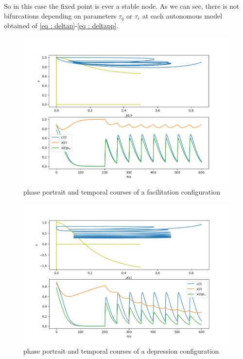 So in this case the fixed point is ever a stable node. As we can see, there is not bifurcations depending on parameters $\tau_q$ or $\tau_c$ at each autonomous model obtained of \eqref{eq : deltap}-\eqref{eq : deltapp}. 
\begin{figure}
\includegraphics[width=\textwidth]{facilitacion.png}
\caption{phase portrait and temporal courses of a facilitation configuration}
\end{figure}
\begin{figure}
\includegraphics[width=\textwidth]{depression.png}
\caption{phase portrait and temporal courses of a depression configuration}
\end{figure}
